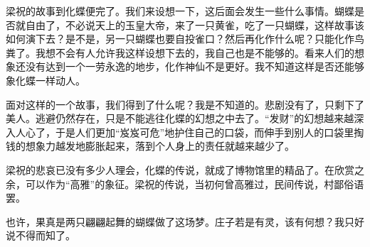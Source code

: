梁祝的故事到化蝶便完了。我们来设想一下，这后面会发生一些什么事情。蝴蝶是否就自由了，不必说天上的玉皇大帝，来了一只黄雀，吃了一只蝴蝶，这样故事该如何演下去？是不是，另一只蝴蝶也要自投雀口？然后再化作什么呢？只能化作鸟粪了。我想不会有人允许我这样设想下去的，我自己也是不能够的。看来人们的想象还没有达到一个一劳永逸的地步，化作神仙不是更好。我不知道这样是否还能够象化蝶一样动人。
	
面对这样的一个故事，我们得到了什么呢？我是不知道的。悲剧没有了，只剩下了美人。逃避仍然存在，只是不能逃往化蝶的幻想之中去了。“发财”的幻想越来越深入人心了，于是人们更加“岌岌可危”地护住自己的口袋，而伸手到别人的口袋里掏钱的想象力越发地膨胀起来，落到个人身上的责任就越来越少了。
	
梁祝的悲哀已没有多少人理会，化蝶的传说，就成了博物馆里的精品了。在欣赏之余，可以作为“高雅”的象征。梁祝的传说，当初何曾高雅过，民间传说，村鄙俗语罢。
	
也许，果真是两只翩翩起舞的蝴蝶做了这场梦。庄子若是有灵，该有何想？我只好说不得而知了。